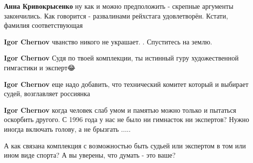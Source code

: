 \begin{itemize}
\begin{itemize}
\textbf{Анна Кривокрысенко} ну как и можно предположить - скрепные аргументы закончились. Как говорится - развалинами рейхстага удовлетворён. Кстати, фамилия соответствующая

 
\textbf{Igor Chernov} чванство никого не украшает. . Спуститесь на землю.

 
\textbf{Igor Chernov} Судя по твоей комплекции, ты истинный гуру художественной гимгастики и эксперт😂

 
\textbf{Igor Chernov} еще надо добавить, что технический комитет который и выбирает судей, возглавляет россиянка

 
\textbf{Igor Chernov} когда человек слаб умом и памятью можно только и пытаться оскорбить другого. С 1996 года у нас не было ни гимнасток ни экспертов? Нужно иногда включать голову, а не брызгать .....

 
А как связана комплекция с возможностью быть судьей или экспертом в том или ином виде спорта? А вы уверены, что думать - это ваше?

 

\end{itemize}
\end{itemize}
